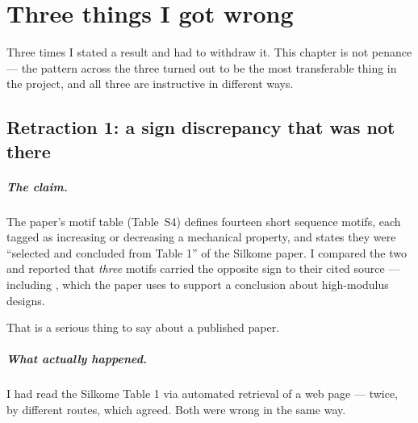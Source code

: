 \chapter{Three things I got wrong}
\label{ch:mistakes}

Three times I stated a result and had to withdraw it. This chapter is not
penance --- the pattern across the three turned out to be the most transferable
thing in the project, and all three are instructive in different ways.

\section{Retraction 1: a sign discrepancy that was not there}
\label{sec:d13}

\paragraph{The claim.} The paper's motif table (Table~S4) defines fourteen
short sequence motifs, each tagged as increasing or decreasing a mechanical
property, and states they were ``selected and concluded from Table 1'' of the
Silkome paper. I compared the two and reported that \emph{three} motifs carried
the opposite sign to their cited source --- including , which the paper
uses to support a conclusion about high-modulus designs.

That is a serious thing to say about a published paper.

\paragraph{What actually happened.} I had read the Silkome Table 1 via automated
retrieval of a web page --- twice, by different routes, which agreed. Both were
wrong in the same way.

